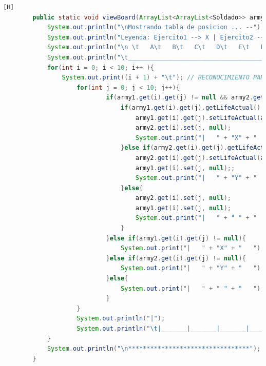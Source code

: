 \documentclass{article}
\begin{document}
	\begin{lstlisting}[language=java,caption={Las lineas de codigos del metodo creado:}][H]
		public static void viewBoard(ArrayList<ArrayList<Soldado>> army1, ArrayList<ArrayList<Soldado>> army2){ //EN ESTE METODO DEMOSTRAREMOS LA TABLA REUTILIZAREMOS CODIGOS DE ANTERIORES LABORATORIOS PARA PODER HACER LA BASE DE ESTE TABLERO
			System.out.println("\nMostrando tabla de posicion ... --");
			System.out.println("Leyenda: Ejercito1 --> X | Ejercito2 --> Y"); //RECONOCIMIENTO PARA LOS EJERCITOS Y POSICION DE SUS SOLDADOS
			System.out.println("\n \t   A\t   B\t   C\t   D\t   E\t   F\t   G\t   H\t   I\t   J"); // RECONOCIMIENTO PARA CADA UBICACION DE CADA SOLDADO EN EL TABLERO POR PARTE DE LAS COLUMNAS
			System.out.println("\t_________________________________________________________________________________");
			for(int i = 0; i < 10; i++ ){
				System.out.print((i + 1) + "\t"); // RECONOCIMIENTO PARA CADA UBICACION DE CADA SOLDADO EN EL TABLERO POR PARTE DE LAS FILAS
					for(int j = 0; j < 10; j++){
							if(army1.get(i).get(j) != null && army2.get(i).get(j) != null){ //CREAMOS UN IF PARA QUE ESTE NOS AYUDE A SABER QUIEN DE ESTOS SOLDADOS SE OCUPARA DEL CASILLERO EL CUAL DONDE ESTAN PELEANDO
								if(army1.get(i).get(j).getLifeActual() > army2.get(i).get(j).getLifeActual()){
									army1.get(i).get(j).setLifeActual(army1.get(i).get(j).getLifeActual() - army2.get(i).get(j).getLifeActual()); //Cambiamos 
									army2.get(i).set(j, null); 
									System.out.print("|   " + "X" + "   ");
								}else if(army2.get(i).get(j).getLifeActual() > army1.get(i).get(j).getLifeActual()){
									army2.get(i).get(j).setLifeActual(army2.get(i).get(j).getLifeActual() - army1.get(i).get(j).getLifeActual());
									army1.get(i).set(j, null);;
									System.out.print("|   " + "Y" + "   ");
								}else{
									army2.get(i).set(j, null);
									army1.get(i).set(j, null);
									System.out.print("|   " + " " + "   ");
								}
							}else if(army1.get(i).get(j) != null){
								System.out.print("|   " + "X" + "   ");
							}else if(army2.get(i).get(j) != null){
								System.out.print("|   " + "Y" + "   ");
							}else{
								System.out.print("|   " + " " + "   ");
							}
					}
					System.out.println("|");
					System.out.println("\t|_______|_______|_______|_______|_______|_______|_______|_______|_______|_______|");
			}
			System.out.println("\n*********************************");
		}

	\end{lstlisting}
\end{document}
